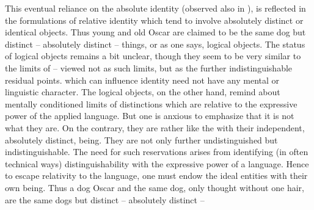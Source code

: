 This eventual reliance on the absolute identity (observed also in
\citeauthor{McGinn}), is reflected in the formulations of relative identity
which tend to involve absolutely distinct or identical objects. Thus young and
old Oscar are claimed to be the same dog but distinct -- absolutely distinct --
things, or as one says, logical objects.  The status of logical objects remains
a bit unclear, though they seem to be very similar to the limits of
 -- viewed not as  such limits, but as the further
indistinguishable residual points.   which can influence
identity need not have any mental or linguistic character.  The logical
objects, on the other hand, remind about mentally conditioned limits of
distinctions which are relative to the expressive power of the applied language.
But one is anxious to emphasize that it is not what they are. On the contrary,
they are rather like the  with their independent, absolutely
distinct, being. They are not only further undistinguished but
indistinguishable. The need for such reservations arises from identifying (in
often technical ways) distinguishability with the expressive power of a
language. Hence to escape relativity to the language, one must endow the ideal
entities with their own being. Thus a dog Oscar and the same dog, only thought
without one hair, are the same dogs but distinct -- absolutely distinct --
